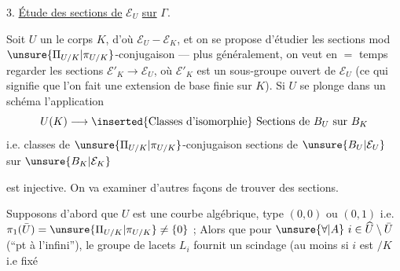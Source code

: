 3. \uline{Étude des sections de} $\mathcal{E}_U$ \uline{sur} $\Gamma$.

Soit $U$ un   le corps $K$, d'où $\mathcal{E}_U-\mathcal{E}_K$, et on se propose d'étudier les sections mod $\unsure{\Pi_{U/K}|\pi_{U/K}}$-conjugaison --- plus généralement, on veut en $=$ temps regarder les sections $\mathcal{E}'_K\longrightarrow\mathcal{E}_U$, où $\mathcal{E}'_K$ est un sous-groupe ouvert de $\mathcal{E}_U$ (ce qui signifie que l'on fait une extension de base finie sur $K$). Si  $U$ se plonge dans un schéma   l'application
\[
U(K)\longrightarrow \inserted{\text{Classes d'isomorphie}}\ \text{Sections de }B_U\text{ sur }B_K
\]
i.e. classes de $\unsure{\Pi_{U/K}|\pi_{U/K}}$-conjugaison  sections de $\unsure{B_U|\mathcal{E}_U}$ sur $\unsure{B_K|\mathcal{E}_K}$

est injective. On va examiner d'autres façons  de trouver des sections.

Supposons d'abord que $U$ est une courbe algébrique,   type $(0,0)$ ou $(0,1)$ i.e. $\pi_1(\bar U)=\unsure{\Pi_{U/K}|\pi_{U/K}}\ne\{0\}$ ; Alors  que pour $\unsure{\forall|A}\ i\in\widehat U\setminus\bar U$ (``pt à l'infini''), le groupe de lacets $L_i$ fournit un scindage (au moins si $i$ est $/K$ i.e fixé

